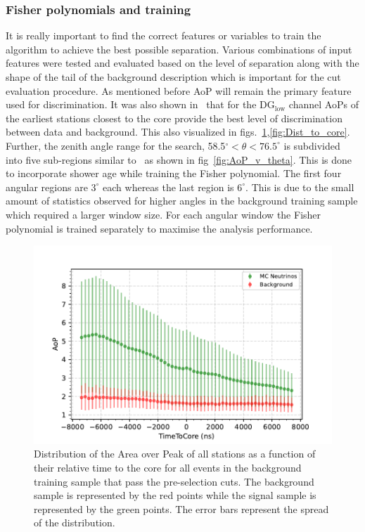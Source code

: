 \subsubsection{Fisher polynomials and training}
\label{subsubsec:nu_sel_fisher_training}
It is really important to find the correct features or variables to train the algorithm to achieve the best possible separation. Various combinations of input features were tested and evaluated based on the level of separation along with the shape of the tail of the background description which is important for the cut evaluation procedure. As mentioned before AoP will remain the primary feature used for discrimination. It was also shown in~\cite{gap_note_2013} that for the DG$\mathrm{_{low}}$ channel AoPs of the earliest stations closest to the core provide the best level of discrimination between data and background. This also visualized in figs.~\ref{fig:Time_to_core},\ref{fig:Dist_to_core}. Further, the zenith angle range for the search, 58.5$^\circ < \theta < 76.5^\circ$ is subdivided into five sub-regions similar to~\cite{gap_note_2013} as shown in fig~\ref{fig:AoP_v_theta}. This is done to incorporate shower age while training the Fisher polynomial. The first four angular regions are $3^\circ$ each whereas the last region is $6^\circ$. This is due to the small amount of statistics observed for higher angles in the background training sample which required a larger window size. For each angular window the Fisher polynomial is trained separately to maximise the analysis performance. 

\begin{figure}[h!]
  \centering
  \includegraphics[width=\textwidth]{thesis_figures/Nu_analysis/Selection_Evo_AoP_Time_mean_redcut.pdf}
  \caption{Distribution of the Area over Peak of all stations as a function of their relative time to the core for all events in the background training sample that pass the pre-selection cuts. The background sample is represented by the red points while the signal sample is represented by the green points. The error bars represent the spread of the distribution.}
  \label{fig:Time_to_core}
\end{figure}

